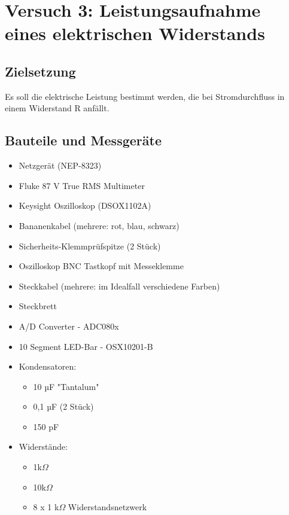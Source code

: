 \documentclass[a4paper,12pt]{article}
\begin{document}
\section{Versuch 3: Leistungsaufnahme eines elektrischen Widerstands}
\subsection{Zielsetzung}
Es soll die elektrische Leistung bestimmt werden, die bei Stromdurchfluss in
einem Widerstand R anfällt.

\subsection{Bauteile und Messgeräte}
\begin{itemize}
\item Netzgerät (NEP-8323)
\item Fluke 87 V True RMS Multimeter
\item Keysight Oszilloskop (DSOX1102A)
\item Bananenkabel (mehrere: rot, blau, schwarz)
\item Sicherheits-Klemmprüfspitze (2 Stück)
\item Oszilloskop BNC Tastkopf mit Messeklemme
\item Steckkabel (mehrere: im Idealfall verschiedene Farben)
\item Steckbrett\\
\end{itemize}


\begin{itemize}
\item A/D Converter - ADC080x
\item 10 Segment LED-Bar - OSX10201-B
\newpage
\item Kondensatoren: 
	\begin{itemize}
	\item 10 µF "Tantalum"
	\item 0,1 µF (2 Stück)
	\item 150 pF
	\end{itemize}
\item Widerstände: 
	\begin{itemize}
	\item 1k$\Omega$
	\item 10k$\Omega$
	\item 8 x 1 k$\Omega$ Widerstandsnetzwerk
	\end{itemize}
\end{itemize}
\end{document}
